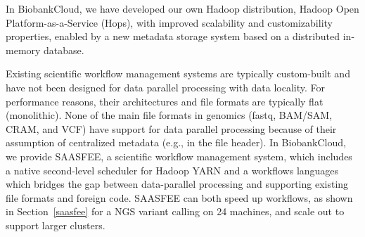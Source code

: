 In BiobankCloud, we have developed our own Hadoop distribution, Hadoop Open Platform-as-a-Service (Hops), with improved scalability and customizability properties, enabled by a new metadata storage system based on a distributed in-memory database.

Existing scientific workflow management systems are typically custom-built and have not been designed for data parallel processing with data locality. For performance reasons, their architectures and file formats are typically flat (monolithic). None of the main file formats in genomics (fastq, BAM/SAM, CRAM, and VCF) have support for data parallel processing because of their assumption of centralized metadata (e.g., in the file header). 
In BiobankCloud, we provide SAASFEE, a scientific workflow management system, which includes a native second-level scheduler for Hadoop YARN and a workflows languages which bridges the gap between data-parallel processing and supporting existing file formats and foreign code. SAASFEE can both speed up workflows, as shown in Section~\ref{saasfee} for a NGS variant calling on 24 machines, and scale out to support larger clusters.